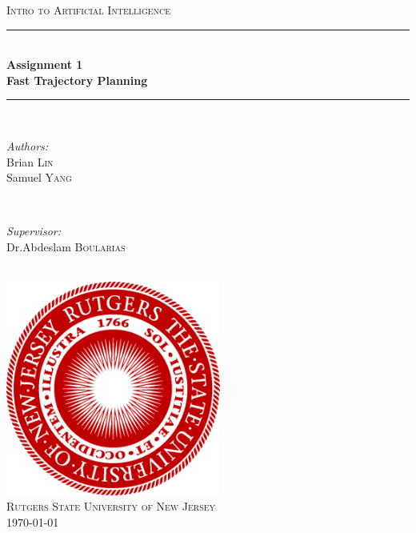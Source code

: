 \documentclass[12pt]{article}
\begin{document}
	
	\begin{titlepage}
		\newcommand{\HRule}{\noindent\rule{6.5in}{1pt}} %
		
		\centering
		
		\textsc{\Large Intro to Artificial Intelligence}\\[.75cm]
		
		\noindent\rule{6.5in}{1.5pt}\\[.75cm]
		{ \huge \bfseries Assignment 1}\\[.4cm]
		{ \large \bfseries Fast Trajectory Planning}\\[.2cm]
		\noindent\rule{6.5in}{1.5pt}\\[1cm]
		
		
		\begin{minipage}{0.4\textwidth}
			\begin{flushleft} \large
				\emph{Authors:}\\
				Brian \textsc{Lin} \\
				Samuel \textsc{Yang}
			\end{flushleft}
		\end{minipage}
		~
		\begin{minipage}{0.4\textwidth}
			\begin{flushright} \large
				\emph{Supervisor:} \\
				Dr.Abdeslam  \textsc{Boularias} %
			\end{flushright}
		\end{minipage}\\[2cm]

		\includegraphics[width=200pt,height=200pt]{RutgersLogo.png}\\[1.5cm]
		\textsc{\Large Rutgers State University of New Jersey}\\[1cm]
		{\large \today}\\[2cm]
		
		\vfill %
		
	\end{titlepage}
	
\end{document}
